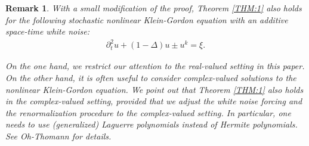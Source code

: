 \documentclass[letterpaper, 11pt,  reqno]{amsart}
\newtheorem{remark}[theorem]{Remark}
\newcommand{\1}{\hspace{0.5mm}\text{I}\hspace{0.5mm}}
\newcommand{\Dl}{\Delta}
\newcommand{\dt}{\partial_t}
\numberwithin{equation}{section}
\numberwithin{theorem}{section}
\begin{document}
\begin{remark}
\rm
	
With a small modification of the proof,  
 Theorem \ref{THM:1} also holds for 
the following stochastic nonlinear Klein-Gordon equation 
with an additive space-time white noise:	
\begin{align}
\dt^2 u  +  (1 -  \Dl)  u   \pm  u^k = \xi.
\label{SNLKG}
\end{align}


	
On the one hand,  we  restrict our attention  to the real-valued setting
in this paper.
On the other hand, it is often useful to consider complex-valued solutions
to the nonlinear Klein-Gordon equation.
We point out that
Theorem \ref{THM:1} also holds in the complex-valued setting, 
provided that we adjust 
the white noise forcing and 
the renormalization procedure
to the complex-valued setting.
In particular, 
one needs to use (generalized) Laguerre polynomials instead of Hermite polynomials.
See Oh-Thomann \cite{OT1} for details.
\end{remark}
\end{document}

